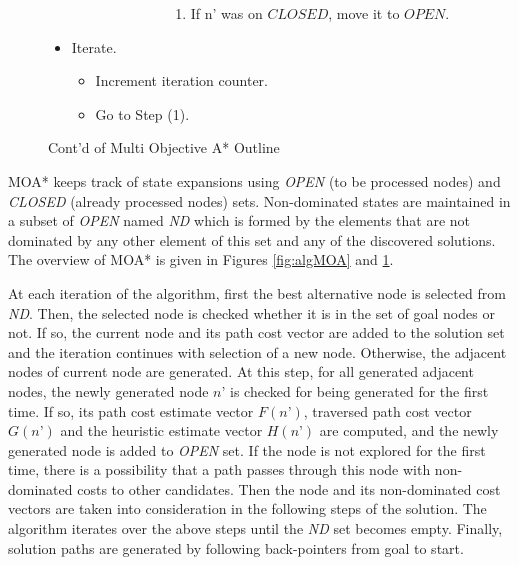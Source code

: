 \begin{figure}
\begin{itemize}
\begin{itemize}
\begin{itemize}
\begin{enumerate}
\begin{enumerate}
\begin{enumerate}
					\item[5.3.2.1.2.2 ] If n’ was on $CLOSED$, move it to $OPEN$.
				\end{enumerate}
			\end{enumerate}
		\end{enumerate}
  	\end{itemize}
  \end{itemize}
  \item[6. ] Iterate.
  \begin{itemize}\setlength{\itemsep}{-2mm}
  	\item[6.1. ] Increment iteration counter.
  	\item[6.2. ] Go to Step (1).
  \end{itemize}
\end{itemize}
\caption{Cont'd of Multi Objective A* Outline}
\label{fig:algMOA_2}
\end{figure}

MOA* keeps track of state expansions using {\it OPEN} (to be processed nodes) and {\it CLOSED} (already processed nodes) sets. Non-dominated states are maintained in a subset of {\it OPEN} named {\it ND} which is formed by the elements that are not dominated by any other element of this set and any of the discovered solutions. The overview of MOA* is given in Figures \ref{fig:algMOA} and \ref{fig:algMOA_2}.

At each iteration of the algorithm, first the best alternative node is selected from {\it ND}. Then, the selected node is checked whether it is in the set of goal nodes or not. If so, the current node and its path cost vector are added to the solution set and the iteration continues with selection of a new node. Otherwise, the adjacent nodes of current node are generated. At this step, for all generated adjacent nodes, the  newly generated node $n’$ is checked for being generated for the first time. If so, its path cost estimate vector $F(n’)$, traversed path cost vector $G(n’)$ and the heuristic estimate vector $H(n’)$ are computed, and the newly generated node is added to {\it OPEN} set. If the node is not explored for the first time, there is a possibility that a path passes through this node with non-dominated costs to other candidates. Then the node and its non-dominated cost vectors are taken into consideration in the following steps of the solution. The algorithm iterates over the above steps until the {\it ND} set becomes empty. Finally, solution paths are generated by following back-pointers from goal to start. 

